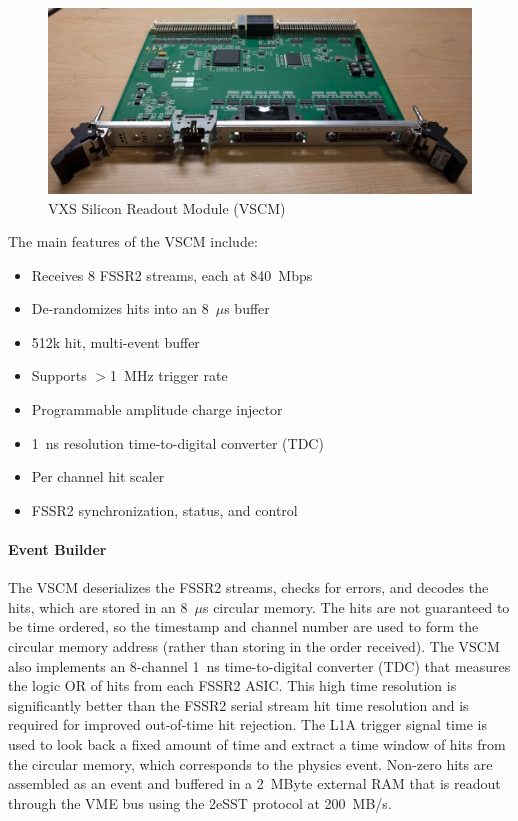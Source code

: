 \begin{figure}[hbt]
	\centering
	\includegraphics[width=1.0\columnwidth,keepaspectratio]{img/vscm_board.png}
	\caption{VXS Silicon Readout Module (VSCM)}
	\label{fig:vscm_board}
\end{figure}

The main features of the VSCM include:

\begin{itemize}
	\item Receives 8 FSSR2 streams, each at 840~Mbps
	\item De-randomizes hits into an 8~$\mu$s buffer
	\item 512k hit, multi-event buffer
	\item Supports $>$1~MHz trigger rate
	\item Programmable amplitude charge injector
	\item 1~ns resolution time-to-digital converter (TDC)
	\item Per channel hit scaler
	\item FSSR2 synchronization, status, and control
\end{itemize}

\paragraph{Event Builder}
The VSCM deserializes the FSSR2 streams, checks for errors, and decodes the hits, which are stored in an 8~$\mu$s circular memory. The hits are not guaranteed to be time ordered, so the timestamp and channel number are used to form the circular memory address (rather than storing in the order received). The VSCM also implements an 8-channel 1~ns time-to-digital converter (TDC) that measures the logic OR of hits from each FSSR2 ASIC. This high time resolution is significantly better than the FSSR2 serial stream hit time resolution and is required for improved out-of-time hit rejection. The L1A trigger signal time is used to look back a fixed amount of time and extract a time window of hits from the circular memory, which corresponds to the physics event. Non-zero hits are assembled as an event and buffered in a 2~MByte external RAM that is readout through the VME bus using the 2eSST protocol at 200~MB/s.

